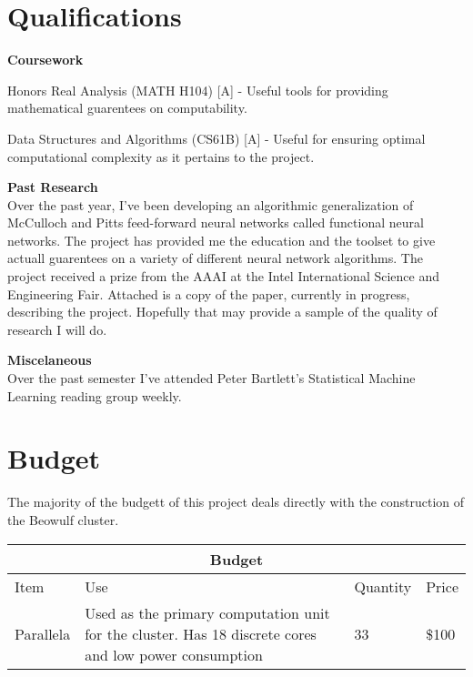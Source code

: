 \documentclass[letter]{article}
\newenvironment{menumerate}{%
  \edef\backupindent{\the\parindent}%
  \enumerate%
  \setlength{\parindent}{\backupindent}%
}{\endenumerate}
\begin{document}
\section{Qualifications}
\textbf{Coursework}
\begin{menumerate}
\item Honors Real Analysis (MATH H104) [A] - Useful tools for providing mathematical guarentees on computability.
\item Data Structures and Algorithms (CS61B) [A] - Useful for ensuring optimal computational complexity as it pertains to the project.
\end{menumerate}


\textbf{Past Research} \\
Over the past year, I've been developing an algorithmic generalization of McCulloch and Pitts feed-forward neural networks
called functional neural networks. The project has provided me the education and the toolset to give actuall guarentees on 
a variety of different neural network algorithms. The project received a prize from the AAAI at the Intel International Science and Engineering Fair.
Attached is a copy of the paper, currently in progress, describing the project. Hopefully that may provide a sample of the quality
of research I will do.

\textbf{Miscelaneous} \\
Over the past semester I've attended Peter Bartlett's Statistical Machine Learning reading group weekly.


\section{Budget}
The majority of the budgett of this project deals directly with the construction of the Beowulf cluster.


\vspace{10mm}
\centering
\begin{tabular}{ |p{2cm}|p{7cm}|p{1.5cm}|p{1cm}|
 }
 \hline
 \multicolumn{4}{|c|}{Budget} \\
 \hline
Item& Use& Quantity&Price\\
 \hline
  Parallela & Used as the primary computation unit for the cluster.  Has 18 discrete cores and low power
  consumption & 33 & \$100 \\
 \hline
\end{tabular}
\end{document}

